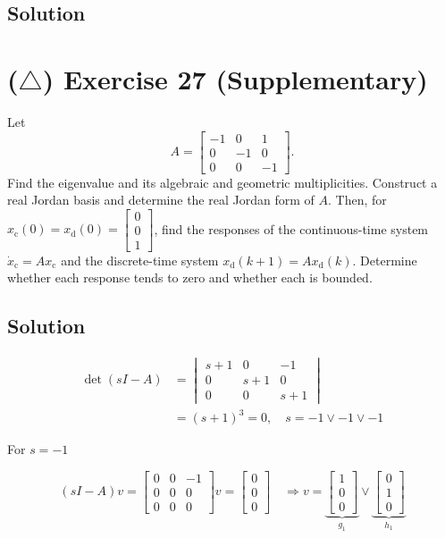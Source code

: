 \documentclass[12pt,a4paper]{article}
\begin{document}
\subsection*{Solution}
\vspace{4cm}
\clearpage
\section*{($\triangle$) Exercise 27 \hfill {\normalsize (Supplementary)}}
Let
\[
A=\begin{bmatrix}
-1&0&1\\
0&-1&0\\
0&0&-1
\end{bmatrix}.
\]
Find the eigenvalue and its algebraic and geometric multiplicities. Construct
a real Jordan basis and determine the real Jordan form of $A$. Then, for
$x_{\mathrm c}(0)=x_{\mathrm d}(0)=\begin{bmatrix}0\\0\\1\end{bmatrix}$,
find the responses of the continuous-time system $\dot x_{\mathrm c}=Ax_{\mathrm c}$
and the discrete-time system $x_{\mathrm d}(k+1)=Ax_{\mathrm d}(k)$. Determine
whether each response tends to zero and whether each is bounded.
\subsection*{Solution}

\begin{align*}
	\det (sI - A) &= \begin{vmatrix}	
	s + 1 & 0 & -1 \\
	0 & s + 1 & 0 \\
	0 & 0 & s + 1
	\end{vmatrix}  \\
	&= (s + 1)^3 = 0, \quad s = -1 \lor -1 \lor -1
\end{align*}

For $s = -1$
 
 \[(sI - A)v = 
 \begin{bmatrix}
 	0 & 0 & -1 \\
 	0 & 0 & 0 \\
 	0 & 0 & 0 
 \end{bmatrix}v = \begin{bmatrix}
 0 \\ 0 \\ 0
 \end{bmatrix} \quad \Rightarrow v = \underbrace{\begin{bmatrix}
 1 \\ 0\\ 0 
 \end{bmatrix}}_{g_1}\lor \underbrace{\begin{bmatrix}
 0 \\ 1 \\ 0
 \end{bmatrix}}_{h_1}
 \]
 
\end{document}
